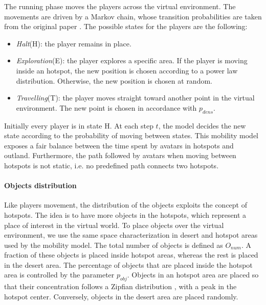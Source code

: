 \documentclass[final,10pt,a5paper]{phdimt}
\theoremstyle{definition}
\begin{document}
The running phase moves the players across the virtual environment. The movements are driven by a Markov chain, whose transition probabilities are taken from the original paper \cite{Legtchenko2010}. The possible states for the players are the following: 

\begin{itemize}
\item \textit{Halt}(H): the player remains in place.
\item \textit{Exploration}(E): the player explores a specific area. If the player is moving inside an hotspot, the new position is chosen according to a power law distribution. Otherwise, the new position is chosen at random.
\item \textit{Travelling}(T): the player moves straight toward another point in the virtual environment. The new point is chosen in accordance with $p_{dens}$.
\end{itemize}

Initially every player is in state H. At each step $t$, the model decides the new state according to the probability of moving between states.
This mobility model exposes a fair balance between the time spent by avatars in hotspots and outland. 
Furthermore, the path followed by avatars when moving between hotspots is not static, 
i.e. no predefined path connects two hotspots. 


\paragraph{Objects distribution}

Like players movement, the distribution of the objects exploits the concept of hotspots.
The idea is to have more objects in the hotspots, which represent a place of interest in the virtual world.
To place objects over the virtual environment, we use the same space characterization in desert and hotspot areas used by the mobility model. 
The total number of objects is defined as $O_{num}$. A  fraction of these objects is placed inside hotspot areas, whereas the rest is placed in the desert area.
The percentage of objects that are placed inside the hotspot area is controlled by the parameter $p_{obj}$. Objects in an hotspot area are placed so that their concentration follows a Zipfian distribution \cite{newman2005power}, with a peak in the hotspot center. Conversely, objects in the desert area are placed randomly.\\
\end{document}
